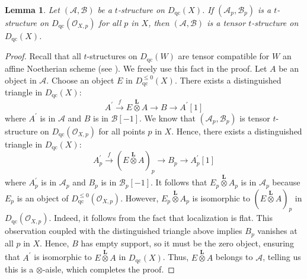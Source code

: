 \documentclass[11pt]{amsart}
\theoremstyle{plain}
\newtheorem{lemma}[theorem]{Lemma}
\theoremstyle{definition}
\numberwithin{equation}{section}
\numberwithin{theorem}{section}
\begin{document}
\begin{lemma}\label{lem:stalks_to_global_tensor_compatible}
    Let $(\mathcal{A},\mathcal{B})$ be a $t$-structure on $D_{\operatorname{qc}}(X)$. If $(\mathcal{A}_p,\mathcal{B}_p)$ is a $t$-structure on $D_{\operatorname{qc}}(\mathcal{O}_{X,p})$ for all $p$ in $X$, then $(\mathcal{A},\mathcal{B})$ is a tensor $t$-structure on $D_{\operatorname{qc}}(X)$.
\end{lemma}

\begin{proof}
    Recall that all $t$-structures on $D_{\operatorname{qc}}(W)$ are tensor compatible for $W$ an affine Noetherian scheme (see \cite[Corollary 3.8]{Lank:2025}). We freely use this fact in the proof. Let $A$ be an object in $\mathcal{A}$. Choose an object $E$ in $D^{\leq 0}_{\operatorname{qc}}(X)$. There exists a distinguished triangle in $D_{\operatorname{qc}}(X)$:
    \begin{displaymath}
        A^\prime \xrightarrow{f} E\overset{\mathbf{L}}{\otimes} A \to B \to A^\prime[1]
    \end{displaymath}
    where $A^\prime$ is in $\mathcal{A}$ and $B$ is in $\mathcal{B}[-1]$. We know that $(\mathcal{A}_p, \mathcal{B}_p)$ is tensor $t$-structure on $D_{\operatorname{qc}}(\mathcal{O}_{X,p})$ for all points $p$ in $X$. Hence, there exists a distinguished triangle in $D_{\operatorname{qc}}(X)$:
    \begin{displaymath}
        A^\prime_p \xrightarrow{f} (E\overset{\mathbf{L}}{\otimes} A)_p \to B_p \to A^\prime_p[1]
    \end{displaymath}
    where $A^\prime_p$ is in $\mathcal{A}_p$ and $B_p$ is in $\mathcal{B}_p[-1]$. It follows that $E_p \overset{\mathbf{L}}{\otimes} A_p$ is in $\mathcal{A}_p$ because $E_p$ is an object of $D_{\operatorname{qc}}^{\leq 0}(\mathcal{O}_{X,p})$. However, $E_p \overset{\mathbf{L}}{\otimes} A_p$ is isomorphic to $(E \overset{\mathbf{L}}{\otimes} A)_p$ in $D_{\operatorname{qc}}(\mathcal{O}_{X,p})$. Indeed, it follows from the fact that localization is flat. This observation coupled with the distinguished triangle above implies $B_p$ vanishes at all $p$ in $X$. Hence, $B$ has empty support, so it must be the zero object, ensuring that  $A^\prime$ is isomorphic to $E \overset{\mathbf{L}}{\otimes} A$ in $D_{\operatorname{qc}}(X)$. Thus, $E\overset{\mathbf{L}}{\otimes} A$ belongs to $\mathcal{A}$, telling us this is a $\otimes$-aisle, which completes the proof. 
\end{proof}
\end{document}

